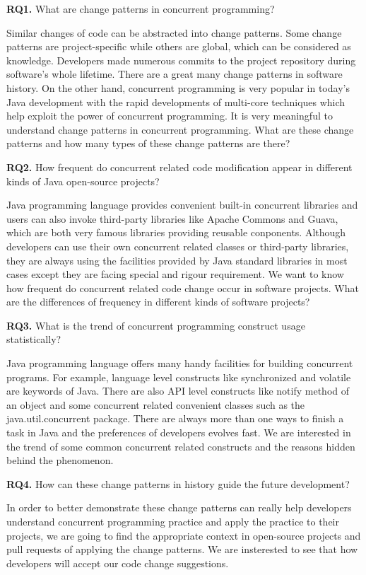\documentclass[conference]{IEEEtran}
\begin{document}
\textbf{RQ1.} What are change patterns in concurrent programming?

Similar changes of code can be abstracted into change patterns. Some change patterns are project-specific while others are global, which can be considered as knowledge. Developers made numerous commits to the project repository during software's whole lifetime. There are a great many change patterns in software history. On the other hand, concurrent programming is very popular in today's Java development with the rapid developments of multi-core techniques which help exploit the power of concurrent programming. It is very meaningful to understand change patterns in concurrent programming. What are these change patterns and how many types of these change patterns are there?

\textbf{RQ2.} How frequent do concurrent related code modification appear in different kinds of Java open-source projects?

Java programming language provides convenient built-in concurrent libraries and users can also invoke third-party libraries like Apache Commons and Guava, which are both very famous libraries providing reusable conponents. Although developers can use their own concurrent related classes or third-party libraries, they are always using the facilities provided by Java standard libraries in most cases except they are facing special and rigour requirement. We want to know how frequent do concurrent related code change occur in software projects. What are the differences of frequency in different kinds of software projects?

\textbf{RQ3.} What is the trend of concurrent programming construct usage statistically?

Java programming language offers many handy facilities for building concurrent programs. For example, language level constructs like synchronized and volatile are keywords of Java.  There are also API level constructs like notify method of an object and some concurrent related convenient classes such as the java.util.concurrent package. There are always more than one ways to finish a task in Java and the preferences of developers evolves fast. We are interested in  the trend of some common concurrent related constructs and the reasons hidden behind the phenomenon.

\textbf{RQ4.} How can these change patterns in history guide the future development?

In order to better demonstrate these change patterns can really help developers understand concurrent programming practice and apply the practice to their projects, we are going to find the appropriate context in open-source projects and pull requests of applying the change patterns. We are insterested to see that how developers will accept our code change suggestions.
\end{document}
